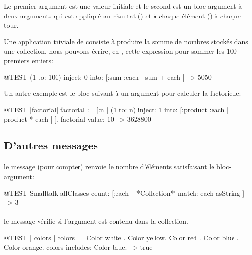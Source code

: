 \documentclass[a4paper,10pt,twoside]{book}
\begin{document}
Le premier argument est une valeur initiale et le second est un bloc-argument
\`a deux arguments qui est appliqu\'e au r\'esultat () et \`a chaque \'el\'ement () \`a chaque tour.

Une application triviale de   consiste \`a produire 
la somme de nombres stock\'es dans une collection.
nous pouvons \'ecrire, en \pharo, cette expression pour sommer les 100 premiers entiers:
\begin{code}{@TEST}
(1 to: 100) inject: 0 into: [:sum :each | sum + each ] --> 5050
\end{code}


Un autre exemple est le bloc suivant \`a un argument pour calculer la factorielle:

\begin{code}{@TEST |factorial|}
factorial := [:n | (1 to: n) inject: 1 into: [:product :each | product * each ] ].
factorial value: 10 --> 3628800
\end{code}

\subsection{D'autres messages}

\paragraph{} le message  (pour compter) renvoie le nombre d'\'el\'ements satisfaisant le bloc-argument: %

\begin{code}{@TEST}
Smalltalk allClasses count: [:each | '*Collection*' match: each asString ] --> 3
\end{code} %

\paragraph{} le message  v\'erifie si l'argument est contenu dans la collection.

\begin{code}{@TEST | colors |}
colors := {Color white . Color yellow. Color red . Color blue . Color orange}.
colors includes: Color blue. --> true
\end{code}
\end{document}
